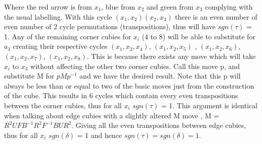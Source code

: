 \documentclass{article}
\begin{document}
Where the red arrow is from $x_1$, blue from $x_2$ and green from $x_3$ complying with the usual labelling. With this cycle $(x_1,x_2) (x_2,x_3)$ there is an even number of even number of 2 cycle permutations (transpositions), thus will have $sgn(\tau)$ = 1. Any of the remaining corner cubies for $x_i$ (4 to 8) will be able to substitute for $a_3$ creating their respective cycles $(x_1,x_2,x_4)$, $(x_1,x_2,x_5)$ , $(x_1,x_2,x_6)$, $(x_1,x_2,x_7)$, $(x_1,x_2,x_8)$. This is because there exists any move which will take $x_i$ to $x_3$ without affecting the other two corner cubies. Call this move p, and substitute M for $pMp^{-1}$ and we have the desired result. Note that this p will always be less than or equal to two of the basic moves just from the construction of the cube. This results in 6 cycles which contain every even transpositions between the corner cubies, thus for all $x_i$ $sgn(\tau)$ = 1. 
This argument is identical when talking about edge cubies with a slightly altered M move , M = $R^{2}UFB^{-1}R^{2}F^{-1}BUR^{2}$. Giving all the even transpositions between edge cubies, thus for all $x_i$ $sgn(\delta)$ = 1 and hence $sgn(\tau) = sgn(\delta) = 1$. 
\newpage



\end{document}
